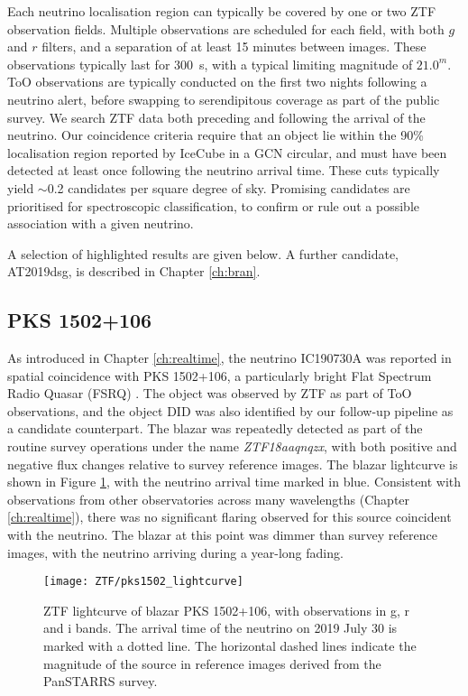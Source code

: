 Each neutrino localisation region can typically be covered by one or two ZTF observation fields. Multiple observations are scheduled for each field, with both $g$ and $r$ filters, and a separation of at least 15 minutes between images. These observations typically last for 300~s, with a typical limiting magnitude of $21.0^{m}$.  ToO observations are typically conducted on the first two nights following a neutrino alert, before swapping to serendipitous coverage as part of the public survey. We search ZTF data both preceding and following the arrival of the neutrino. Our coincidence criteria require that an object lie within the 90\% localisation region reported by IceCube in a GCN circular, and must have been detected at least once following the neutrino arrival time. These cuts typically yield $\sim$0.2 candidates per square degree of sky. Promising candidates are prioritised for spectroscopic classification, to confirm or rule out a possible association with a given neutrino. 

A selection of highlighted  results are given below. A further candidate, AT2019dsg, is described in Chapter \ref{ch:bran}.

\subsection{PKS 1502+106}
As introduced in Chapter \ref{ch:realtime}, the neutrino IC190730A was reported in spatial coincidence with PKS 1502+106, a particularly bright Flat Spectrum Radio Quasar (FSRQ) . The object was observed by ZTF as part of ToO observations, and the object DID was also identified by our follow-up pipeline as a candidate counterpart.  The blazar was repeatedly detected as part of the routine survey operations under the name \emph{ZTF18aaqnqzx}, with both positive and negative flux changes relative to survey reference images. The blazar lightcurve is shown in Figure \ref{fig:pks1502_ligtcurve}, with the neutrino arrival time marked in blue. Consistent with observations from other observatories across many wavelengths (Chapter \ref{ch:realtime}), there was no significant flaring observed for this source coincident with the neutrino. The blazar at this point was dimmer than survey reference images, with the neutrino arriving during a year-long fading. 

\begin{figure}[!ht]
	\centering \texttt{[image: ZTF/pks1502\_lightcurve]}
	\caption{ZTF lightcurve of blazar PKS 1502+106, with observations in g, r and i bands. The arrival time of the neutrino on 2019 July 30 is marked with a dotted line. The horizontal dashed lines indicate the magnitude of the source in reference images derived from the PanSTARRS survey.}
	\label{fig:pks1502_ligtcurve}
\end{figure}

